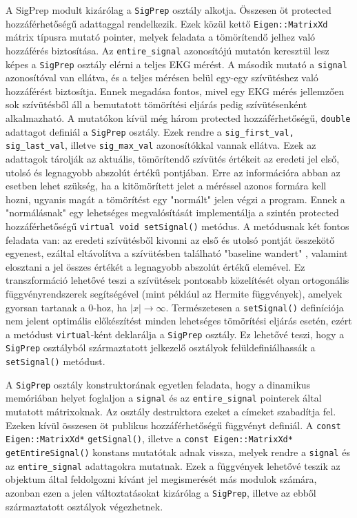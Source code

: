 \documentclass[oneside,titlepage,12pt,a4paper]{report}
\begin{document}
\par A SigPrep modult kizárólag a \texttt{SigPrep} osztály alkotja. Összesen öt protected hozzáférhetőségű adattaggal rendelkezik. Ezek közül kettő \texttt{Eigen::MatrixXd} mátrix típusra mutató pointer, melyek feladata a tömörítendő jelhez való hozzáférés biztosítása. Az \texttt{entire\_signal} azonosítójú mutatón keresztül lesz képes a \texttt{SigPrep} osztály elérni a teljes EKG mérést. A második mutató a \texttt{signal} azonosítóval van ellátva, és a teljes mérésen belül egy-egy szívütéshez való hozzáférést biztosítja. Ennek megadása fontos, mivel egy EKG mérés jellemzően sok szívütésből áll a bemutatott tömörítési eljárás pedig szívütésenként alkalmazható. A mutatókon kívül még három protected hozzáférhetőségű, \texttt{double} adattagot definiál a \texttt{SigPrep} osztály. Ezek rendre a \texttt{sig\_first\_val, sig\_last\_val}, illetve \texttt{sig\_max\_val} azonosítókkal vannak ellátva. Ezek az adattagok tárolják az aktuális, tömörítendő szívütés értékeit az eredeti jel első, utolsó és legnagyobb abszolút értékű pontjában. Erre az információra abban az esetben lehet szükség, ha a kitömörített jelet a méréssel azonos formára kell hozni, ugyanis magát a tömörítést egy "normált" jelen végzi a program. Ennek a "normálásnak" egy lehetséges megvalósítását implementálja a szintén protected hozzáférhetőségű \texttt{virtual void setSignal()} metódus. A metódusnak két fontos feladata van: az eredeti szívütésből kivonni az első és utolsó pontját összekötő egyenest, ezáltal eltávolítva a szívütésben található "baseline wandert" \cite{ecgDataCompressionTech}, valamint elosztani a jel összes értékét a legnagyobb abszolút értékű elemével. Ez transzformáció lehetővé teszi a szívütések pontosabb közelítését olyan ortogonális függvényrendszerek segítségével (mint például az Hermite függvények), amelyek gyorsan tartanak a 0-hoz, ha $|x| \to \infty$. Természetesen a \texttt{setSignal()} definíciója nem jelent optimális előkészítést minden lehetséges tömörítési eljárás esetén, ezért a metódust \texttt{virtual}-ként deklarálja a \texttt{SigPrep} osztály. Ez lehetővé teszi, hogy a \texttt{SigPrep} osztályból származtatott jelkezelő osztályok felüldefiniálhassák a \texttt{setSignal()} metódust. 
\par A \texttt{SigPrep} osztály konstruktorának egyetlen feladata, hogy a dinamikus memóriában helyet foglaljon a \texttt{signal} és az \texttt{entire\_signal} pointerek által mutatott mátrixoknak. Az osztály destruktora ezeket a címeket szabadítja fel.  \linebreak Ezeken kívül összesen öt publikus hozzáférhetőségű függvényt definiál. \linebreak A \texttt{const Eigen::MatrixXd*} \texttt{getSignal()}, illetve a \texttt{const Eigen::MatrixXd*} \linebreak \texttt{getEntireSignal()} konstans mutatótak adnak vissza, melyek rendre a \texttt{signal} és az \texttt{entire\_signal} adattagokra mutatnak. Ezek a függvények lehetővé teszik az objektum által feldolgozni kívánt jel megismerését más modulok számára, azonban ezen a jelen változtatásokat kizárólag a \texttt{SigPrep}, illetve az ebből származtatott osztályok végezhetnek.
\end{document}
